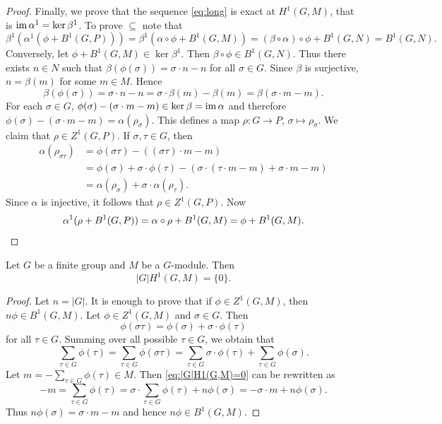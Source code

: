 \begin{proof}
    Finally, we prove that the sequence \eqref{eq:long} is exact
    at $H^1(G,M)$, that is $\operatorname{im}\alpha^1=\ker\beta^1$. To prove $\subseteq$  
    note that 
    \[
    \beta^1(\alpha^1(\phi+B^1(G,P)))=\beta^1(\alpha\circ\phi+B^1(G,M))
    =(\beta\circ\alpha)\circ\phi+B^1(G,N)=B^1(G,N).
    \]
    Conversely, let $\phi+B^1(G,M)\in\ker\beta^1$. Then $\beta\circ\phi\in B^1(G,N)$. Thus
    there exists $n\in N$ such that $\beta(\phi(\sigma))=\sigma\cdot n-n$ 
    for all $\sigma\in G$. Since $\beta$ is surjective, 
    $n=\beta(m)$ for some $m\in M$. Hence 
    \[
    \beta(\phi(\sigma))=\sigma\cdot n-n=\sigma\cdot \beta(m)-\beta(m)
    =\beta(\sigma\cdot m-m).
    \]
    For each $\sigma\in G$, 
    $\phi(\sigma)-(\sigma\cdot m-m)\in\ker\beta=\operatorname{im}\alpha$ 
    and therefore  $\phi(\sigma)-(\sigma\cdot m-m)=\alpha(\rho_\sigma)$. 
    This defines a map $\rho\colon G\to P$, $\sigma\mapsto\rho_\sigma$.
    We claim that $\rho\in Z^1(G,P)$. If $\sigma,\tau\in G$, then
    \begin{align*}    
    \alpha(\rho_{\sigma\tau})&=\phi(\sigma\tau)-( (\sigma\tau)\cdot m-m)\\
    &=\phi(\sigma)+\sigma\cdot\phi(\tau)-(\sigma\cdot (\tau\cdot m-m)+\sigma\cdot m-m)\\
    &=\alpha(\rho_\sigma)+\sigma\cdot\alpha(\rho_\tau).
    \end{align*}
    Since $\alpha$ is injective, it follows that $\rho\in Z^1(G,P)$.
    Now
    \[
    \alpha^1(\rho+B^1(G,P))=\alpha\circ\rho+B^1(G,M)=\phi+B^1(G,M).\qedhere
    \]
\end{proof}

\begin{theorem}
    Let $G$ be a finite group and $M$ be a $G$-module. 
    Then 
    \[
    |G|H^1(G,M)=\{0\}.
    \]
\end{theorem}

\begin{proof}
    Let $n=|G|$. It is enough to prove that 
    if $\phi\in Z^1(G,M)$, then $n\phi\in B^1(G,M)$. Let $\phi\in Z^1(G,M)$ and 
    $\sigma\in G$. Then 
    \[
    \phi(\sigma\tau)=\phi(\sigma)+\sigma\cdot\phi(\tau)
    \]
    for all $\tau\in G$. Summing over all possible $\tau\in G$, we obtain that 
    \begin{equation}
        \label{eq:|G|H1(G,M)=0}    
        \sum_{\tau\in G}\phi(\tau)=\sum_{\tau\in G}\phi(\sigma\tau)
        =\sum_{\tau\in G}\sigma\cdot\phi(\tau)+\sum_{\tau\in G}\phi(\sigma).
    \end{equation}
    Let $m=-\sum_{\tau\in G}\phi(\tau)\in M$. Then 
    \eqref{eq:|G|H1(G,M)=0} can be rewritten as 
    \[
    -m=\sum_{\tau\in G}\phi(\tau)=\sigma\cdot \sum_{\tau\in G}\phi(\tau)+n\phi(\sigma)
    =-\sigma\cdot m+n\phi(\sigma).
    \]
    Thus $n\phi(\sigma)=\sigma\cdot m-m$ and hence $n\phi\in B^1(G,M)$.  
\end{proof}

